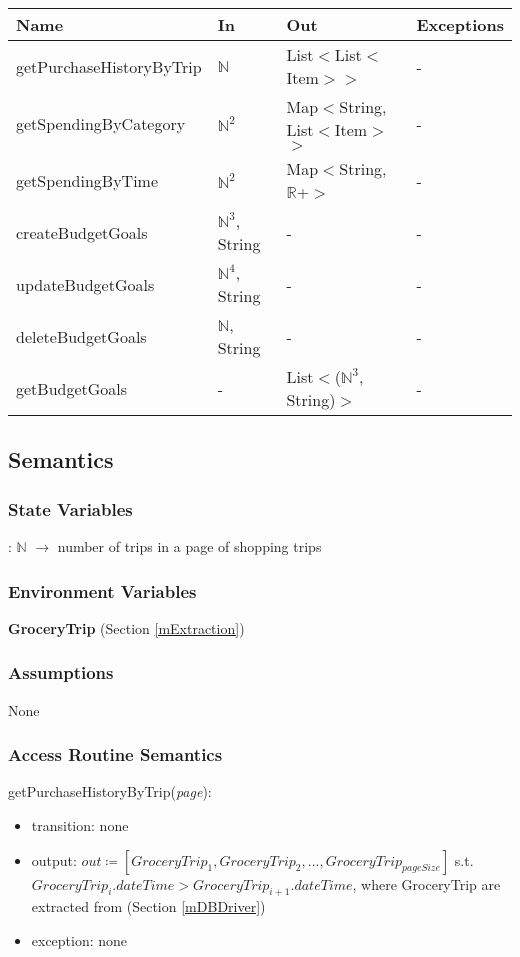 \documentclass[12pt, titlepage]{article}
\begin{document}
\begin{center}

\begin{tabular}{p{5cm} p{3cm} p{4cm} p{4cm}}
\hline
\textbf{Name} & \textbf{In} & \textbf{Out} & \textbf{Exceptions} \\
\hline
getPurchaseHistoryByTrip & $\mathbb{N}$ & List$<$List$<$Item$>$$>$  & - \\
getSpendingByCategory & $\mathbb{N}^2$ & Map$<$String, List$<$Item$>$$>$  & - \\
getSpendingByTime & $\mathbb{N}^2$ & Map$<$String, $\mathbb{R}$+$>$ & - \\
createBudgetGoals & $\mathbb{N}^3$, String & - & - \\
updateBudgetGoals & $\mathbb{N}^4$, String & - & - \\
deleteBudgetGoals & $\mathbb{N}$, String & - & - \\
getBudgetGoals & - & List$<$($\mathbb{N}^3$, String)$>$ & - \\
\hline
\end{tabular}
\end{center}

\subsection{Semantics}

\subsubsection{State Variables}
 : \textbf{$\mathbb{N}$} $\rightarrow$ number of trips in a page of shopping trips 

\subsubsection{Environment Variables}
\textbf{GroceryTrip} (Section \ref{mExtraction})


\subsubsection{Assumptions}
None

\subsubsection{Access Routine Semantics}

\noindent getPurchaseHistoryByTrip(\textit{page}):
\begin{itemize}
\item transition: none
\item output: $\textit{out} \coloneqq [GroceryTrip_{1}, GroceryTrip_{2},..., GroceryTrip_{pageSize}]$ s.t. \\ $GroceryTrip_{i}.dateTime > GroceryTrip_{i+1}.dateTime$, where GroceryTrip are extracted from (Section \ref{mDBDriver})
\item exception: none
\end{itemize}
\end{document}
